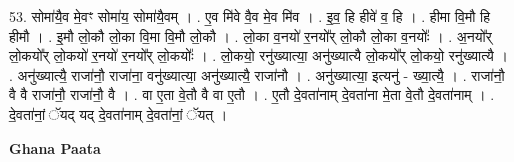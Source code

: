 \documentclass[17pt]{extarticle}
\begin{document}
53. सोमा॑यै॒व मे॒वꣳ सोमा॑य॒ सोमा॑यै॒वम् । . ए॒व मि॑वे वै॒व मे॒व मि॑व । . इ॒व॒ हि हीवे॑ व॒ हि । . हीमा वि॒मौ हि हीमौ । . इ॒मौ लो॒कौ लो॒का वि॒मा वि॒मौ लो॒कौ । . लो॒का व॒नयो॑ र॒नयो᳚र् लो॒कौ लो॒का व॒नयोः᳚ । . अ॒नयो᳚र् लो॒कयो᳚र् लो॒कयो॑ र॒नयो॑ र॒नयो᳚र् लो॒कयोः᳚ । . लो॒कयो॒ रनु॑ख्यात्या॒ अनु॑ख्यात्यै लो॒कयो᳚र् लो॒कयो॒ रनु॑ख्यात्यै । . अनु॑ख्यात्यै॒ राजा॑नौ॒ राजा॑ना॒ वनु॑ख्यात्या॒ अनु॑ख्यात्यै॒ राजा॑नौ । . अनु॑ख्यात्या॒ इत्यनु॑ - ख्या॒त्यै॒ । . राजा॑नौ॒ वै वै राजा॑नौ॒ राजा॑नौ॒ वै । . वा ए॒ता वे॒तौ वै वा ए॒तौ । . ए॒तौ दे॒वता॑नाम् दे॒वता॑ना मे॒ता वे॒तौ दे॒वता॑नाम् । . दे॒वता॑नां॒ ॅयद् यद् दे॒वता॑नाम् दे॒वता॑नां॒ ॅयत् । \newline

\textbf{Ghana Paata } \newline
\end{document}
